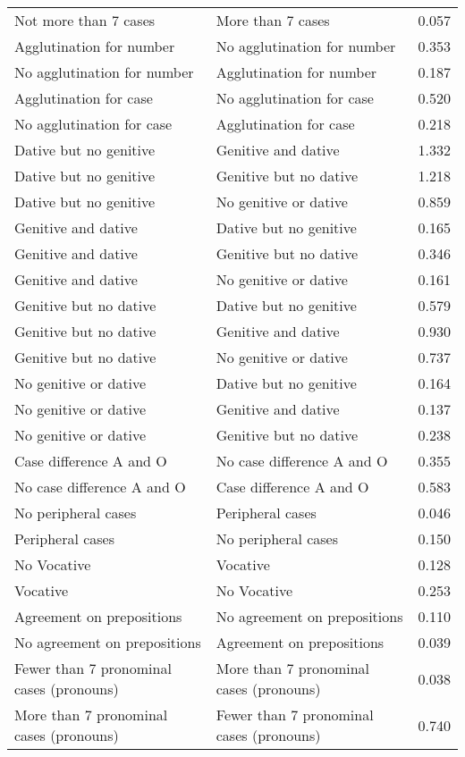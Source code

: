 \begin{longtable}{p{.4\linewidth}p{.4\linewidth}p{.1\linewidth}}
Not more than 7 cases & More than 7 cases & 0.057\\
Agglutination for number & No agglutination for number & 0.353\\
No agglutination for number & Agglutination for number & 0.187\\
Agglutination for case & No agglutination for case & 0.520\\
No agglutination for case & Agglutination for case & 0.218\\
Dative but no genitive & Genitive and dative & 1.332\\
Dative but no genitive & Genitive but no dative & 1.218\\
Dative but no genitive & No genitive or dative & 0.859\\
Genitive and dative & Dative but no genitive & 0.165\\
Genitive and dative & Genitive but no dative & 0.346\\
Genitive and dative & No genitive or dative & 0.161\\
Genitive but no dative & Dative but no genitive & 0.579\\
Genitive but no dative & Genitive and dative & 0.930\\
Genitive but no dative & No genitive or dative & 0.737\\
No genitive or dative & Dative but no genitive & 0.164\\
No genitive or dative & Genitive and dative & 0.137\\
No genitive or dative & Genitive but no dative & 0.238\\
Case difference A and O & No case difference A and O & 0.355\\
No case difference A and O & Case difference A and O & 0.583\\
No peripheral cases & Peripheral cases & 0.046\\
Peripheral cases & No peripheral cases & 0.150\\
No Vocative & Vocative & 0.128\\
Vocative & No Vocative & 0.253\\
Agreement on prepositions & No agreement on prepositions & 0.110\\
No agreement on prepositions & Agreement on prepositions & 0.039\\
Fewer than 7 pronominal cases (pronouns) & More than 7 pronominal cases (pronouns) & 0.038\\
More than 7 pronominal cases (pronouns) & Fewer than 7 pronominal cases (pronouns) & 0.740\\

\end{longtable}
